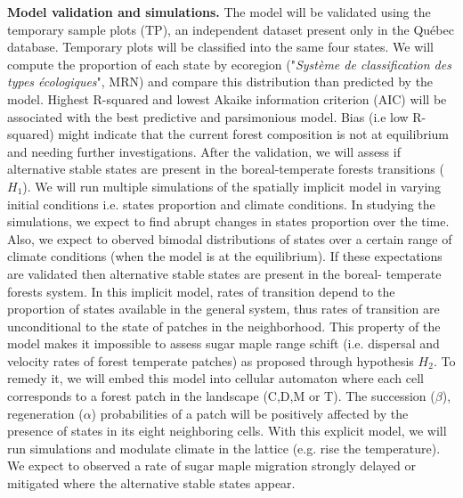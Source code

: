 \textbf{Model validation and simulations.}  The model will be validated using
the temporary sample plots (TP), an independent dataset present only in the
Québec database. Temporary plots will be classified into the same four states.
We will compute the proportion of each state by ecoregion ("\textit{Système de
classification des types écologiques}", MRN) and compare this distribution than
predicted by the model.  Highest R-squared and lowest Akaike information
criterion (AIC) will be associated with the best predictive and parsimonious
model. Bias (i.e low R-squared) might indicate that the current forest
composition is not at equilibrium and needing further investigations. After the
validation, we will assess if alternative stable states are present in the
boreal-temperate forests transitions ($H_1$). We will run multiple simulations
of the spatially implicit model in varying initial conditions i.e. states
proportion and climate conditions. In studying the simulations, we expect to
find abrupt changes in states proportion over the time. Also, we expect to
oberved bimodal distributions of states over a certain range of climate
conditions (when the model is at the equilibrium). If these expectations are
validated then alternative stable states are present in the boreal- temperate
forests system.  In this implicit model, rates of transition depend to the
proportion of states available in the general system, thus rates of transition
are unconditional to the state of patches in the neighborhood. This property of
the model makes it impossible to assess sugar maple range schift (i.e. dispersal
and velocity rates of forest temperate patches) as proposed through hypothesis
$H_2$. To remedy it, we will embed this model into cellular automaton where each
cell corresponds to a forest patch in the landscape (C,D,M or T). The succession
($\beta$), regeneration ($\alpha$) probabilities of a patch will be positively
affected by the presence of states in its eight neighboring cells.  With this
explicit model, we will run simulations and modulate climate in the lattice
(e.g. rise the temperature). We expect to observed a rate of sugar maple
migration strongly delayed or mitigated   where the alternative stable states
appear.


\clearpage

